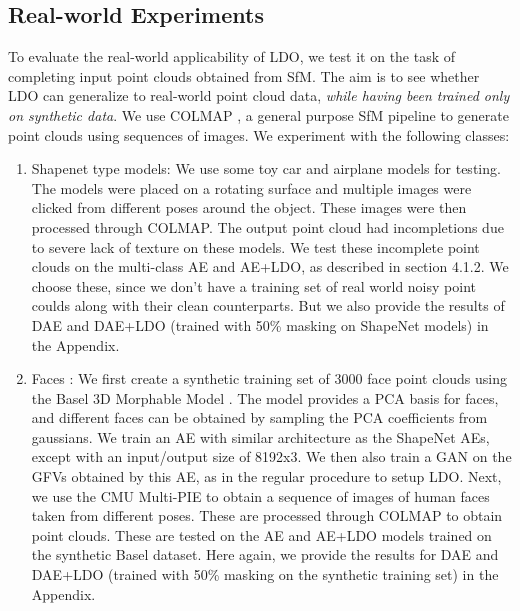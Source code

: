 \documentclass[10pt,twocolumn,letterpaper]{article}
\begin{document}
\subsection{Real-world Experiments}
\label{sec:rw}
To evaluate the real-world applicability of LDO, we test it on the task of completing input point clouds obtained from SfM. The aim is to see whether LDO can generalize to real-world point cloud data, \textit{while having been trained only on synthetic data}. We use COLMAP \cite{colmap}, a general purpose SfM pipeline to generate point clouds using sequences of images.  We experiment with the following classes:
\begin{enumerate}
    \item Shapenet type models: We use some toy car and airplane models for testing. The models were placed on a rotating surface and multiple images were clicked from different poses around the object. These images were then processed through COLMAP. The output point cloud had incompletions due to severe lack of texture on these models. We test these incomplete point clouds on the multi-class AE and AE+LDO, as described in section 4.1.2. We choose these, since we don't have a training set of real world noisy point coulds along with their clean counterparts. But we also provide the results of DAE and DAE+LDO (trained with 50\% masking on ShapeNet models) in the Appendix. 
    \item Faces : We first create a synthetic training set of 3000 face point clouds using the Basel 3D Morphable Model \cite{basel}. The model provides a PCA basis for faces, and different faces can be obtained by sampling the PCA coefficients from gaussians. We train an AE with similar architecture as the ShapeNet AEs, except with an input/output size of 8192x3. We then also train a GAN on the GFVs obtained by this AE, as in the regular procedure to setup LDO. 
    Next, we use the CMU Multi-PIE \cite{multipie} to obtain a sequence of images of human faces taken from different poses. These are processed through COLMAP to obtain point clouds. These are tested on the AE and AE+LDO models trained on the synthetic Basel dataset. Here again, we provide the results for DAE and DAE+LDO (trained with 50\% masking on the synthetic training set) in the Appendix. 
\end{enumerate}
\end{document}
